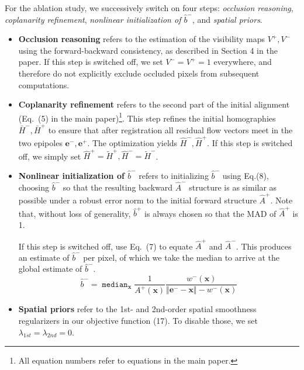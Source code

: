 \documentclass[10pt,twocolumn,letterpaper]{article}
\DeclareMathOperator*{\median}{\mathtt{median}}
\begin{document}
For the ablation study, we successively switch on four steps: \textit{occlusion reasoning}, \textit{coplanarity refinement}, \textit{nonlinear initialization of $\hat{b}^-$}, and \textit{spatial priors}.


\begin{itemize}
\item \textbf{Occlusion reasoning} refers to the estimation of the visibility maps $V^+, V^-$ using the forward-backward consistency, as described in Section 4 in the paper.
If this step is switched off, we set $V^- = V^+ = 1$ everywhere, and therefore do not explicitly exclude occluded pixels from subsequent computations.
\item \textbf{Coplanarity refinement} refers to the second part of the initial alignment (Eq.~(5) in the main paper)\footnote{All equation numbers refer to equations in the main paper.}. This step refines the initial homographies $\bar{H}^-,\bar{H}^+$ to ensure that after registration all residual flow vectors meet in the two epipoles $\mathbf{e}^-, \mathbf{e}^+$.
The optimization yields $\hat{H}^-,\hat{H}^+$.
If this step is switched off, we simply set $\hat{H}^+ = \tilde{H}^+, \hat{H}^- = \tilde{H}^-$.
\item \textbf{Nonlinear initialization of $\hat{b}^-$} refers to initializing $\hat{b}^-$ using Eq.(8), \ie choosing $\hat{b}^-$ so that the resulting backward $\hat{A}^-$ structure is as similar as possible under a robust error norm to the initial forward structure $\hat{A}^+$.
Note that, without loss of generality, $\hat{b}^+$ is always chosen so that the MAD of $\hat{A}^+$ is 1.

If this step is switched off, use Eq.~(7) to equate $\hat{A}^+$ and $\hat{A}^-$.
This produces an estimate of $\hat{b}^-$ per pixel, of which we take the median to arrive at the global estimate of $\hat{b}^-$.
\begin{equation}
\hat{b}^- = \median_\mathbf{x} \frac{1}{A^+(\mathbf{x})} \frac{w^-(\mathbf{x})}{\Vert \mathbf{e}^- - \mathbf{x} \Vert - w^-(\mathbf{x})}
\end{equation}
\item \textbf{Spatial priors} refer to the 1st- and 2nd-order spatial smoothness regularizers in our objective function (17). To disable those, we set $\lambda_{1st} = \lambda_{2nd} = 0$.
\end{itemize}
\end{document}

